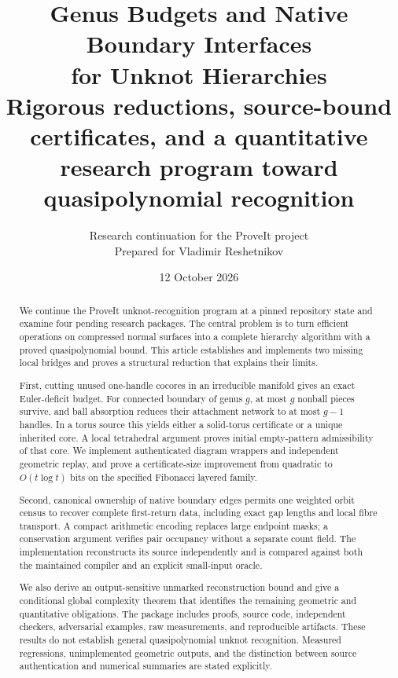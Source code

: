 \documentclass[11pt,a4paper]{article}
\title{\textbf{Genus Budgets and Native Boundary Interfaces\\
for Unknot Hierarchies}\\[8pt]
\large Rigorous reductions, source-bound certificates, and a quantitative
research program toward quasipolynomial recognition}
\author{Research continuation for the ProveIt project\\
\normalsize Prepared for Vladimir Reshetnikov}
\date{12 October 2026}
\theoremstyle{definition}
\theoremstyle{remark}
\begin{document}
\maketitle
{}
\thispagestyle{empty}
\begin{abstract}
We continue the ProveIt unknot-recognition program at a pinned repository
state and examine four pending research packages.  The central problem is
to turn efficient operations on compressed normal surfaces into a complete
hierarchy algorithm with a proved quasipolynomial bound.  This article
establishes and implements two missing local bridges and proves a
structural reduction that explains their limits.

First, cutting unused one-handle cocores in an irreducible manifold gives
an exact Euler-deficit budget.  For connected boundary of genus $g$, at
most $g$ nonball pieces survive, and ball absorption reduces their
attachment network to at most $g-1$ handles.  In a torus source this yields
either a solid-torus certificate or a unique inherited core.  A local
tetrahedral argument proves initial empty-pattern admissibility of that
core.  We implement authenticated diagram wrappers and independent
geometric replay, and prove a certificate-size improvement from quadratic
to $O(t\log t)$ bits on the specified Fibonacci layered family.

Second, canonical ownership of native boundary edges permits one weighted
orbit census to recover complete first-return data, including exact gap
lengths and local fibre transport.  A compact arithmetic encoding replaces
large endpoint masks; a conservation argument verifies pair occupancy
without a separate count field.  The implementation reconstructs its
source independently and is compared against both the maintained compiler
and an explicit small-input oracle.

We also derive an output-sensitive unmarked reconstruction bound and give
a conditional global complexity theorem that identifies the remaining
geometric and quantitative obligations.  The package includes proofs,
source code, independent checkers, adversarial examples, raw measurements,
and reproducible artifacts.  These results do not establish general
quasipolynomial unknot recognition.  Measured regressions, unimplemented
geometric outputs, and the distinction between source authentication and
numerical summaries are stated explicitly.
\end{abstract}
\end{document}
